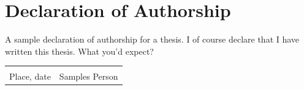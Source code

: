 \chapter*{Declaration of Authorship}

A sample declaration of authorship for a thesis. I of course declare that I have written this thesis. What you'd expect?

\vspace{2cm}

\noindent
\begin{tabular}{@{}p{6cm}p{6cm}@{}}
\hrulefill & \hrulefill \\
Place, date & Samples Person \\
\end{tabular}

